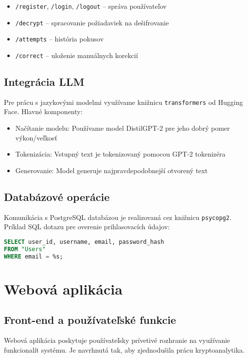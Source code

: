 \documentclass[12pt,a4paper]{article}
\begin{document}
\begin{itemize}
    \item \texttt{/register}, \texttt{/login}, \texttt{/logout} -- správa používateľov
    \item \texttt{/decrypt} -- spracovanie požiadaviek na dešifrovanie
    \item \texttt{/attempts} -- história pokusov
    \item \texttt{/correct} -- uloženie manuálnych korekcií
\end{itemize}

\subsection{Integrácia LLM}
Pre prácu s jazykovými modelmi využívame knižnicu \texttt{transformers} od Hugging Face. Hlavné komponenty:

\begin{itemize}
    \item Načítanie modelu: Používame model DistilGPT-2 pre jeho dobrý pomer výkon/veľkosť
    \item Tokenizácia: Vstupný text je tokenizovaný pomocou GPT-2 tokenizéra
    \item Generovanie: Model generuje najpravdepodobnejší otvorený text
\end{itemize}

\subsection{Databázové operácie}
Komunikácia s PostgreSQL databázou je realizovaná cez knižnicu \texttt{psycopg2}. Príklad SQL dotazu pre overenie prihlasovacích údajov:

\begin{lstlisting}[language=SQL]
SELECT user_id, username, email, password_hash
FROM "Users"
WHERE email = %s;
\end{lstlisting}

\section{Webová aplikácia}
\subsection{Front-end a používateľské funkcie}
Webová aplikácia poskytuje používateľsky prívetivé rozhranie na využívanie funkcionalít systému. Je navrhnutá tak, aby zjednodušila prácu kryptoanalytika.
\end{document}
